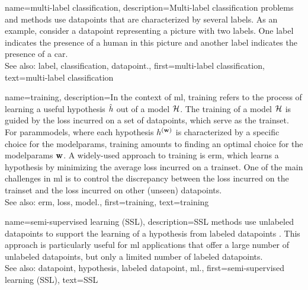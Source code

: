 {name={multi-label classification}, 
	description={Multi-\gls{label} 
		\gls{classification} problems and methods use \glspl{datapoint} 
		that are characterized by several \glspl{label}. As an example, consider a \gls{datapoint} 
		representing a picture with two \glspl{label}. One \gls{label} indicates the presence of a human 
		in this picture and another \gls{label} indicates the presence of a car.
				\\
		See also: \gls{label}, \gls{classification}, \gls{datapoint}.},
	    first={multi-label classification},
	    text={multi-label classification} 
}

{name={training}, 
	description={In the context of \gls{ml}, training refers to the process 
	of learning a useful \gls{hypothesis} $\hat{h}$ out of a \gls{model} $\mathcal{H}$. 
	The training of a \gls{model} $\mathcal{H}$ is guided by the \gls{loss} incurred on a set 
	of \glspl{datapoint}, which serve as the \gls{trainset}. For \glspl{parammodel}, 
	where each \gls{hypothesis} $h^{({\bf w})}$ is characterized by a specific 
	choice for the \glspl{modelparam}, training amounts to finding an optimal choice for the 
	\glspl{modelparam} ${\bf w}$. A widely-used approach to training is \gls{erm}, which 
	learns a \gls{hypothesis} by minimizing the average \gls{loss} incurred on a \gls{trainset}. 
	One of the main challenges in \gls{ml} is to control the discrepancy between the 
	\gls{loss} incurred on the \gls{trainset} and the \gls{loss} incurred on other (unseen) \glspl{datapoint}.
				\\
		See also: \gls{erm}, \gls{loss}, \gls{model}.},
	    first={training},
	    text={training} 
}


{name={semi-supervised learning (SSL)}, 
	description={SSL methods use unlabeled \glspl{datapoint}
		to support the learning of a \gls{hypothesis} from \glspl{labeled datapoint} \cite{SemiSupervisedBook}. 
		This approach is particularly useful for \gls{ml} applications that offer a large number of 
		unlabeled \glspl{datapoint}, but only a limited number of \glspl{labeled datapoint}.
			\\
		See also: \gls{datapoint}, \gls{hypothesis}, \gls{labeled datapoint}, \gls{ml}.}, 
	first={semi-supervised learning (SSL)},
	text={SSL} 
}
	

